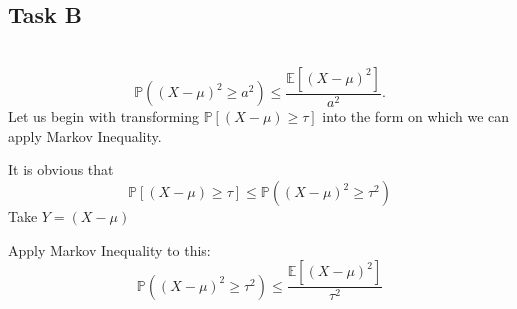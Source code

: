 \documentclass{article}
\begin{document}
\subsection*{Task B}
\
\[
\mathbb{P}((X - \mu)^2 \geq a^2) \leq \frac{\mathbb{E}[(X - \mu)^2]}{a^2}.
\]
Let us begin with transforming $\mathbb{P}[(X - \mu) \geq \tau]$ into the form on which we can apply Markov Inequality.

It is obvious that
\[
\mathbb{P}[(X - \mu) \geq \tau] \leq \mathbb{P}((X - \mu)^2 \geq \tau^2) 
\]
Take $Y=(X-\mu)$

Apply Markov Inequality to this:
\[
\mathbb{P}((X - \mu)^2 \geq \tau^2) \leq \frac{\mathbb{E}[(X - \mu)^2]}{\tau^2}
\]
\section{}
\end{document}
